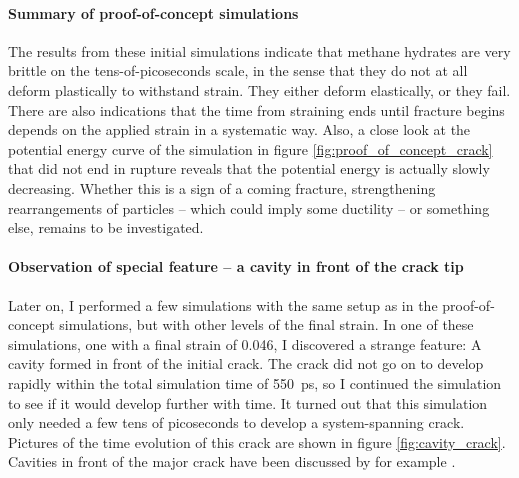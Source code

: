 \paragraph{Summary of proof-of-concept simulations} The results from these initial simulations indicate that methane hydrates are very brittle on the tens-of-picoseconds scale, in the sense that they do not at all deform plastically to withstand strain. They either deform elastically, or they fail. There are also indications that the time from straining ends until fracture begins depends on the applied strain in a systematic way. Also, a close look at the potential energy curve of the simulation in figure \ref{fig:proof_of_concept_crack} that did not end in rupture reveals that the potential energy is actually slowly decreasing. Whether this is a sign of a coming fracture, strengthening rearrangements of particles -- which could imply some ductility -- or something else, remains to be investigated. 

\paragraph{Observation of special feature -- a cavity in front of the crack tip}
Later on, I performed a few simulations with the same setup as in the proof-of-concept simulations, but with other levels of the final strain. In one of these simulations, one with a final strain of 0.046, I discovered a strange feature: A cavity formed in front of the initial crack. The crack did not go on to develop rapidly within the total simulation time of \SI{550}{\pico\second}, so I continued the simulation to see if it would develop further with time. It turned out that this simulation only needed a few tens of picoseconds to develop a system-spanning crack. Pictures of the time evolution of this crack are shown in figure \ref{fig:cavity_crack}. Cavities in front of the major crack have been discussed by for example \citet{Bouchbinder2004}.


